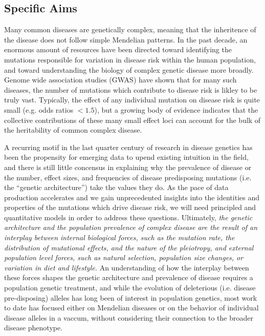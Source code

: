\documentclass[11pt]{article}
\begin{document}

\subsection*{Specific Aims}


Many common diseases are genetically complex, meaning that the inheritence of the disease does not follow simple Mendelian patterns. In the past decade, an enormous amount of resources have been directed toward identifying the mutations responsible for variation in disease risk within the human population, and toward understanding the biology of complex genetic disease more broadly. Genome wide association studies (GWAS) have shown that for many such diseases, the number of mutations which contribute to disease risk is likley to be truly vast. Typically, the effect of any individual mutation on disease risk is quite small (e.g. odds ratios $<1.5$), but a growing body of evidence indicates that the collective contributions of these many small effect loci can account for the bulk of the heritability of common complex disease.

A recurring motif in the last quarter century of research in disease genetics has been the propensity for emerging data to upend existing intuition in the field, and there is still little concensus in explaining why the prevalence of disease or the number, effect sizes, and frequencies of disease predisposing mutations (i.e. the ``genetic architecture'') take the values they do. As the pace of data production accelerates and we gain unprecedented insights into the identities and properties of the mutations which drive disease risk, we will need principled and quantitative models in order to address these questions. Ultimately, \emph{the genetic architecture and the population prevalence of complex disease are the result of an interplay between internal biological forces, such as the mutation rate, the distribution of mutational effects, and the nature of the pleiotropy, and external population level forces, such as natural selection, population size changes, or variation in diet and lifestyle.} An understanding of how the interplay between these forces shapes the genetic architecture and prevalence of disease requires a population genetic treatment, and while the evolution of deleterious (i.e. disease pre-disposing) alleles has long been of interest in population genetics, most work to date has focused either on Mendelian diseases or on the behavior of individual disease alleles in a vaccum, without considering their connection to the broader disease phenotype.
\end{document}

